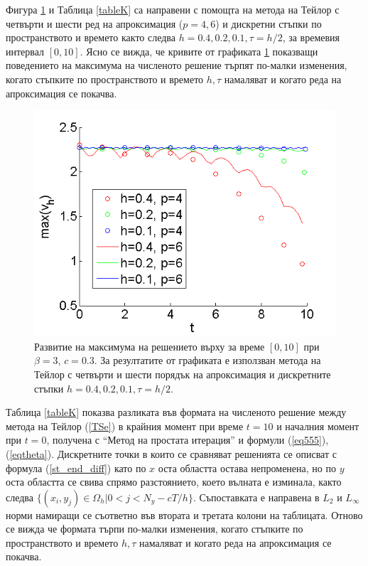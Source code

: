 \documentclass{article}
\newcommand{\rf}[1]{(\ref{#1})}
\theoremstyle{remark}
\begin{document}
Фигура \ref{MultiMaximum} и Таблица \ref{tableK} са направени с помощта на метода на Тейлор с четвърти и шести ред на апроксимация ($p=4,6$) и дискретни стъпки по пространството и времето както следва $h=0.4, 0.2, 0.1, \tau = h/2$, за времевия интервал $[0, 10]$. Ясно се вижда, че кривите от графиката \ref{MultiMaximum} показващи поведението на максимума на численото решение търпят по-малки изменения, когато стъпките по пространството и времето $h, \tau$ намаляват и когато реда на апроксимация се покачва.

\begin{figure}\vspace{0.2cm}
	\includegraphics[width=\linewidth]{Maximum_TaylorZeroBnd_50x50_bt3_c030.png}
\caption{Развитие на максимума на решението върху за време $[0, 10]$ при $\beta = 3$, $c=0.3$. За резултатите от графиката е използван метода на Тейлор с четвърти и шести порядък на апроксимация и дискретните стъпки $h=0.4, 0.2, 0.1, \tau = h/2$.}
\label{MultiMaximum}
\end{figure}
\FloatBarrier

Таблица \ref{tableK} показва разликата във формата на численото решение между метода на Тейлор \rf{TSe} в крайния момент при време $t=10$ и началния момент при $t=0$, получена с ``Метод на простата итерация'' и формули \rf{eq555}, \rf{eqtheta}. Дискретните точки в които се сравняват решенията се описват с формула \rf{st_end_diff} като по $x$ оста областта остава непроменена, но по $y$ оста областта се свива спрямо разстоянието, което вълната е изминала, както следва $\{(x_i, y_j) \in \Omega_h |0 < j < N_y - cT/h\}$. Съпоставката е направена в $L_2$ и $L_\infty$ норми намиращи се съответно във втората и третата колони на таблицата. Отново се вижда че формата търпи по-малки изменения, когато стъпките по пространството и времето $h, \tau$ намаляват и когато реда на апроксимация се покачва.
\end{document}

